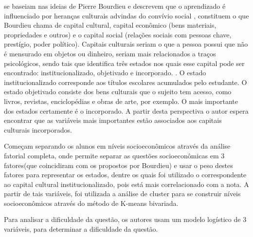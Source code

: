 	 se baseiam nas ideias de Pierre Bourdieu e descrevem que o aprendizado é influenciado por heranças culturais advindas do convívio social , constituem o que Bourdieu chama de capital cultural, capital econômico (bens materiais, propriedades e outros) e o capital social (relações sociais com pessoas chave, prestígio, poder político). Capitais culturais seriam o que a pessoa possui que não é mensurado em objetos ou dinheiro, seriam mais relacionados a traços psicológicos, sendo tais que identifica três estados nos quais esse capital pode ser encontrado: institucionalizado, objetivado e incorporado. . O estado institucionalizado corresponde aos títulos escolares acumulados pelo estudante. O estado objetivado consiste dos bens culturais que o sujeito tem acesso, como livros, revistas, enciclopédias e obras de arte, por exemplo. O mais importante dos estados certamente é o incorporado. A partir desta perspectiva o autor espera encontrar que as variáveis mais importantes estão associados aos capitais culturais incorporados.

	Começam separando os alunos em níveis socioeconômicos através da análise fatorial completa, onde permite separar as questões socioeconômicas em 3 fatores(que coincidiram com os propostos por Bourdieu) e usar o peso destes fatores para representar os estados, dentre os quais foi utilizado o correspondente ao capital cultural institucionalizado, pois está mais correlacionado com a nota. A partir de tais variáveis, foi utilizada a análise de cluster para se construir níveis socioeconômicos através do método de K-means bivariada.

	Para analisar a dificuldade da questão, os autores usam um modelo logístico de 3 variáveis, para determinar a dificuldade da questão.
